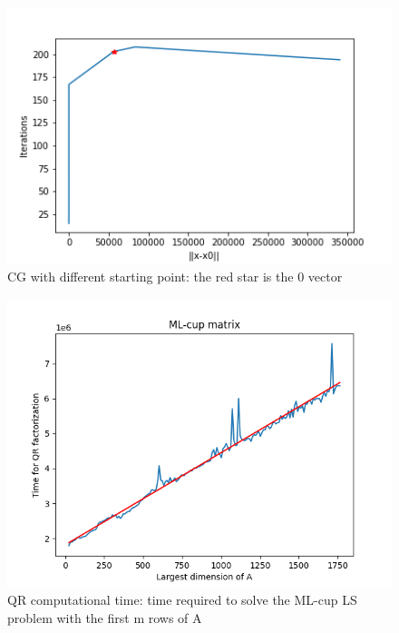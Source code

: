 \documentclass{article}
\begin{document}
	\begin{figure}
            \includegraphics[width=\linewidth]{../results/cg_x0_ite.png}
            \caption{CG with different starting point: the red star is the 0 vector}
             \label{cg_x0}
       \end{figure}
         \begin{figure}
            \includegraphics[width=\linewidth]{../results/qr_linear_scaling.png}
            \caption{QR computational time: time required to solve the ML-cup LS problem with the first m rows of A}
             \label{qr_cost}
        \end{figure}
\end{document}
